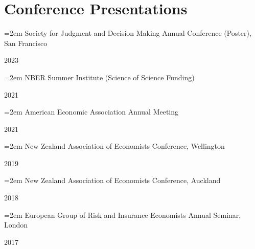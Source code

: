 \documentclass[11pt,oneside]{memoir}
\newcommand{\datedentry}[2]{\par\parbox[t]{0.9\hsize}{\strut\raggedright\hangindent=2em #2\strut}\hfill#1}
\begin{document}
\section{Conference Presentations}

\datedentry{2023}{Society for Judgment and Decision Making Annual Conference (Poster), San Francisco}
\datedentry{2021}{NBER Summer Institute (Science of Science Funding)}
\datedentry{2021}{American Economic Association Annual Meeting}
\datedentry{2019}{New Zealand Association of Economists Conference, Wellington}
\datedentry{2018}{New Zealand Association of Economists Conference, Auckland}
\datedentry{2017}{European Group of Risk and Insurance Economists Annual Seminar, London}
\end{document}
